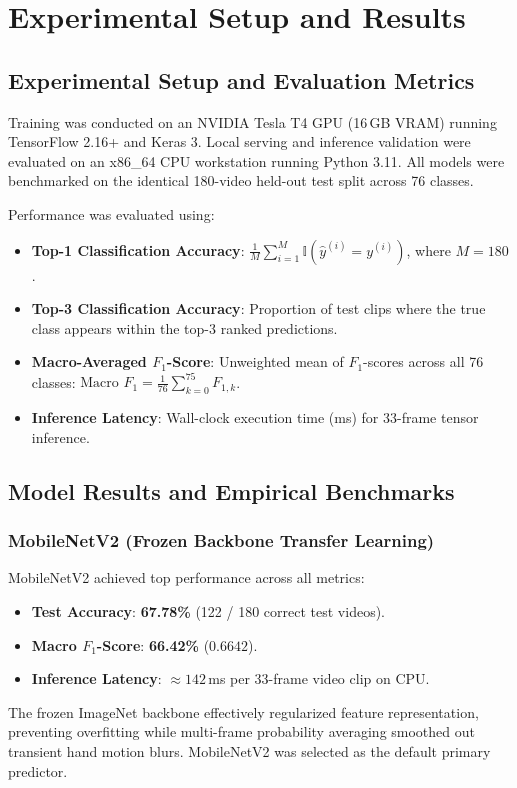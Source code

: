 \chapter{Experimental Setup and Results}
\label{ch:experiments}

\section{Experimental Setup and Evaluation Metrics}
\label{sec:exp_setup}
Training was conducted on an NVIDIA Tesla T4 GPU (16\,GB VRAM) running TensorFlow 2.16+ and Keras 3. Local serving and inference validation were evaluated on an x86\_64 CPU workstation running Python 3.11. All models were benchmarked on the identical 180-video held-out test split across 76 classes.

Performance was evaluated using:
\begin{itemize}
    \item \textbf{Top-1 Classification Accuracy}: $\frac{1}{M} \sum_{i=1}^M \mathbb{I}(\hat{y}^{(i)} = y^{(i)})$, where $M = 180$.
    \item \textbf{Top-3 Classification Accuracy}: Proportion of test clips where the true class appears within the top-3 ranked predictions.
    \item \textbf{Macro-Averaged $F_1$-Score}: Unweighted mean of $F_1$-scores across all 76 classes: $\text{Macro } F_1 = \frac{1}{76} \sum_{k=0}^{75} F_{1, k}$.
    \item \textbf{Inference Latency}: Wall-clock execution time (ms) for 33-frame tensor inference.
\end{itemize}

\section{Model Results and Empirical Benchmarks}
\label{sec:model_results}

\subsection{MobileNetV2 (Frozen Backbone Transfer Learning)}
MobileNetV2 achieved top performance across all metrics:
\begin{itemize}
    \item \textbf{Test Accuracy}: \textbf{67.78\%} (122 / 180 correct test videos).
    \item \textbf{Macro $F_1$-Score}: \textbf{66.42\%} ($0.6642$).
    \item \textbf{Inference Latency}: $\approx 142$\,ms per 33-frame video clip on CPU.
\end{itemize}
The frozen ImageNet backbone effectively regularized feature representation, preventing overfitting while multi-frame probability averaging smoothed out transient hand motion blurs. MobileNetV2 was selected as the default primary predictor.

